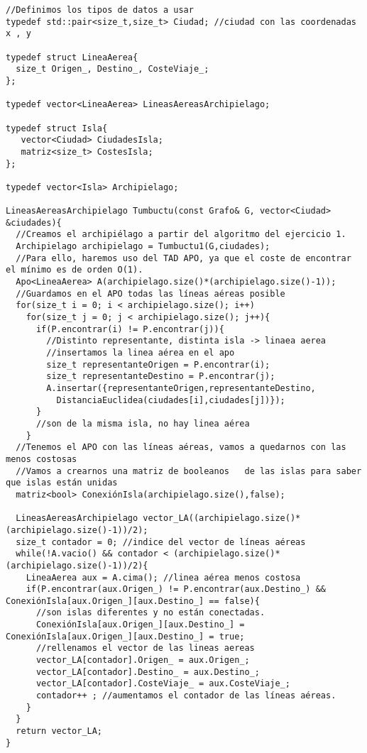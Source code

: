 \begin{verbatim}
//Definimos los tipos de datos a usar
typedef std::pair<size_t,size_t> Ciudad; //ciudad con las coordenadas x , y

typedef struct LineaAerea{
  size_t Origen_, Destino_, CosteViaje_;
};

typedef vector<LineaAerea> LineasAereasArchipielago;

typedef struct Isla{
   vector<Ciudad> CiudadesIsla;
   matriz<size_t> CostesIsla;
};

typedef vector<Isla> Archipielago;

LineasAereasArchipielago Tumbuctu(const Grafo& G, vector<Ciudad> &ciudades){
  //Creamos el archipiélago a partir del algoritmo del ejercicio 1.
  Archipielago archipielago = Tumbuctu1(G,ciudades);
  //Para ello, haremos uso del TAD APO, ya que el coste de encontrar el mínimo es de orden O(1).
  Apo<LineaAerea> A(archipielago.size()*(archipielago.size()-1));
  //Guardamos en el APO todas las líneas aéreas posible
  for(size_t i = 0; i < archipielago.size(); i++)
    for(size_t j = 0; j < archipielago.size(); j++){
      if(P.encontrar(i) != P.encontrar(j)){
        //Distinto representante, distinta isla -> linaea aerea
        //insertamos la linea aérea en el apo
        size_t representanteOrigen = P.encontrar(i);
        size_t representanteDestino = P.encontrar(j);
        A.insertar({representanteOrigen,representanteDestino,
          DistanciaEuclidea(ciudades[i],ciudades[j])});
      }
      //son de la misma isla, no hay linea aérea
    }
  //Tenemos el APO con las líneas aéreas, vamos a quedarnos con las menos costosas
  //Vamos a crearnos una matriz de booleanos   de las islas para saber que islas están unidas
  matriz<bool> ConexiónIsla(archipielago.size(),false);

  LineasAereasArchipielago vector_LA((archipielago.size()*(archipielago.size()-1))/2);
  size_t contador = 0; //indice del vector de líneas aéreas
  while(!A.vacio() && contador < (archipielago.size()*(archipielago.size()-1))/2){
    LineaAerea aux = A.cima(); //linea aérea menos costosa
    if(P.encontrar(aux.Origen_) != P.encontrar(aux.Destino_) && ConexiónIsla[aux.Origen_][aux.Destino_] == false){ 
      //son islas diferentes y no están conectadas. 
      ConexiónIsla[aux.Origen_][aux.Destino_] = ConexiónIsla[aux.Origen_][aux.Destino_] = true;
      //rellenamos el vector de las lineas aereas
      vector_LA[contador].Origen_ = aux.Origen_;
      vector_LA[contador].Destino_ = aux.Destino_;
      vector_LA[contador].CosteViaje_ = aux.CosteViaje_;
      contador++ ; //aumentamos el contador de las líneas aéreas.
    }
  }
  return vector_LA;
}
\end{verbatim}


